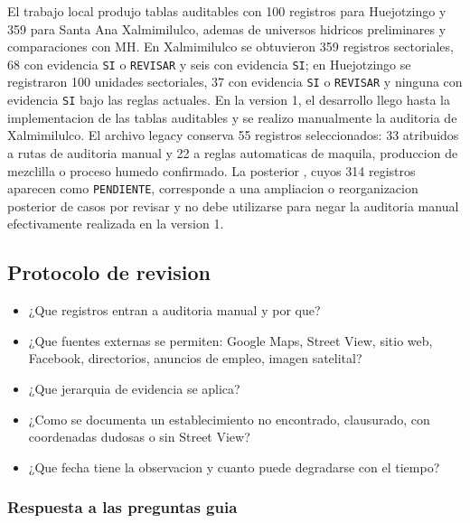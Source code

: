\documentclass[11pt,letterpaper]{article}
\begin{document}
El trabajo local produjo tablas auditables con 100 registros para Huejotzingo y 359 para Santa Ana Xalmimilulco, ademas de universos hidricos preliminares y comparaciones con MH. En Xalmimilulco se obtuvieron 359 registros sectoriales, 68 con evidencia \texttt{SI} o \texttt{REVISAR} y seis con evidencia \texttt{SI}; en Huejotzingo se registraron 100 unidades sectoriales, 37 con evidencia \texttt{SI} o \texttt{REVISAR} y ninguna con evidencia \texttt{SI} bajo las reglas actuales. En la version 1, el desarrollo llego hasta la implementacion de las tablas auditables y se realizo manualmente la auditoria de Xalmimilulco. El archivo legacy  conserva 55 registros seleccionados: 33 atribuidos a rutas de auditoria manual y 22 a reglas automaticas de maquila, produccion de mezclilla o proceso humedo confirmado. La posterior , cuyos 314 registros aparecen como \texttt{PENDIENTE}, corresponde a una ampliacion o reorganizacion posterior de casos por revisar y no debe utilizarse para negar la auditoria manual efectivamente realizada en la version 1.

\subsection{Protocolo de revision}
\begin{preguntas}
\begin{itemize}
    \item ¿Que registros entran a auditoria manual y por que?
    \item ¿Que fuentes externas se permiten: Google Maps, Street View, sitio web, Facebook, directorios, anuncios de empleo, imagen satelital?
    \item ¿Que jerarquia de evidencia se aplica?
    \item ¿Como se documenta un establecimiento no encontrado, clausurado, con coordenadas dudosas o sin Street View?
    \item ¿Que fecha tiene la observacion y cuanto puede degradarse con el tiempo?
\end{itemize}
\end{preguntas}

\subsubsection*{Respuesta a las preguntas guia}
\end{document}
